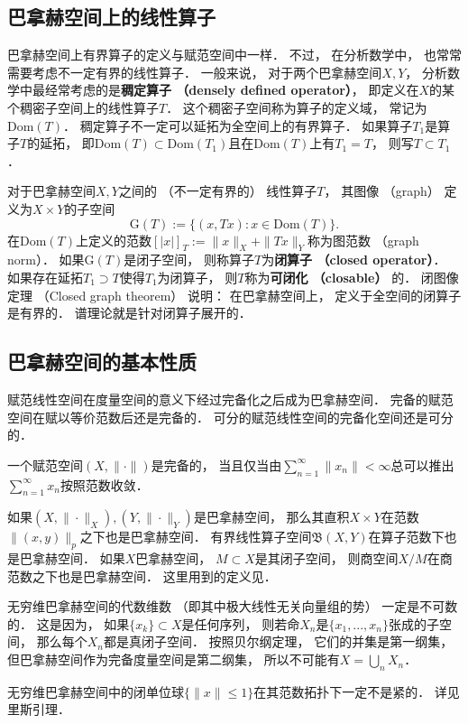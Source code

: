 \subsection{巴拿赫空间上的线性算子}
巴拿赫空间上有界算子的定义与赋范空间中一样． 不过， 在分析数学中， 也常常需要考虑不一定有界的线性算子． 一般来说， 对于两个巴拿赫空间$X,Y$， 分析数学中最经常考虑的是\textbf{稠定算子 （densely defined operator）}， 即定义在$X$的某个稠密子空间上的线性算子$T$． 这个稠密子空间称为算子的定义域， 常记为$\text{Dom}(T)$． 稠定算子不一定可以延拓为全空间上的有界算子． 如果算子$T_1$是算子$T$的延拓， 即$\text{Dom}(T)\subset \text{Dom}(T_1)$且在$\text{Dom}(T)$上有$T_1=T$， 则写$T\subset T_1$．

对于巴拿赫空间$X,Y$之间的 （不一定有界的） 线性算子$T$， 其图像 （graph） 定义为$X\times Y$的子空间
$$
\text{G}(T):=\{(x,Tx):x\in \text{Dom}(T)\}.
$$
在$\text{Dom}(T)$上定义的范数$[|x|]_T:=\|x\|_X+\|Tx\|_Y$称为图范数 （graph norm）． 如果$\text{G}(T)$是闭子空间， 则称算子$T$为\textbf{闭算子 （closed operator）}． 如果存在延拓$T_1\supset T$使得$T_1$为闭算子， 则$T$称为\textbf{可闭化 （closable）} 的． 闭图像定理 （Closed graph theorem） 说明： 在巴拿赫空间上， 定义于全空间的闭算子是有界的． 谱理论就是针对闭算子展开的．

\subsection{巴拿赫空间的基本性质}
赋范线性空间在度量空间的意义下经过完备化之后成为巴拿赫空间． 完备的赋范空间在赋以等价范数后还是完备的． 可分的赋范线性空间的完备化空间还是可分的． 

一个赋范空间$(X,\|\cdot\|)$是完备的， 当且仅当由$\sum _{n=1}^{\infty }\|x_{n}\|<\infty $总可以推出$\sum _{n=1}^{\infty }x_{n}$按照范数收敛．

如果$(X,\|\cdot\|_X),(Y,\|\cdot\|_Y)$是巴拿赫空间， 那么其直积$X\times Y$在范数$\|(x,y)\|_{p}$之下也是巴拿赫空间． 有界线性算子空间$\mathfrak{B}(X,Y)$在算子范数下也是巴拿赫空间． 如果$X$巴拿赫空间， $M\subset X$是其闭子空间， 则商空间$X/M$在商范数之下也是巴拿赫空间． 这里用到的定义见．

无穷维巴拿赫空间的代数维数 （即其中极大线性无关向量组的势） 一定是不可数的． 这是因为， 如果$\{x_k\}\subset X$是任何序列， 则若命$X_n$是$\{x_1,...,x_n\}$张成的子空间， 那么每个$X_n$都是真闭子空间． 按照贝尔纲定理， 它们的并集是第一纲集， 但巴拿赫空间作为完备度量空间是第二纲集， 所以不可能有$X=\bigcup_n X_n$．

无穷维巴拿赫空间中的闭单位球$\{\|x\|\leq1\}$在其范数拓扑下一定不是紧的． 详见里斯引理．